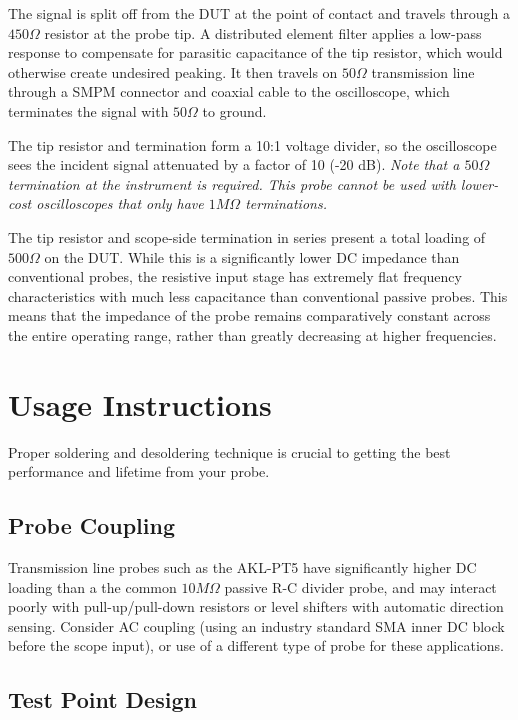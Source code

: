 \documentclass[11pt]{article}
\begin{document}
The signal is split off from the DUT at the point of contact and travels through a $450\Omega$ resistor at the probe
tip. A distributed element filter applies a low-pass response to compensate for parasitic capacitance of the tip
resistor, which would otherwise create undesired peaking. It then travels on $50\Omega$ transmission line through a
SMPM connector and coaxial cable to the oscilloscope, which terminates the signal with $50\Omega$ to ground.

The tip resistor and termination form a 10:1 voltage divider, so the oscilloscope sees the incident signal attenuated
by a factor of 10 (-20 dB). \emph{Note that a $50 \Omega$ termination at the instrument is required. This probe cannot
be used with lower-cost oscilloscopes that only have $1M \Omega$ terminations.}

The tip resistor and scope-side termination in series present a total loading of $500 \Omega$ on the DUT. While this is
a significantly lower DC impedance than conventional probes, the resistive input stage has extremely flat frequency
characteristics with much less capacitance than conventional passive probes. This means that the impedance of the probe
remains comparatively constant across the entire operating range, rather than greatly decreasing at higher frequencies.

\pagebreak

\section{Usage Instructions}

Proper soldering and desoldering technique is crucial to getting the best performance and lifetime from your probe.

\subsection{Probe Coupling}

Transmission line probes such as the AKL-PT5 have significantly higher DC loading than a the common $10M\Omega$ passive
R-C divider probe, and may interact poorly with pull-up/pull-down resistors or level shifters with automatic direction
sensing. Consider AC coupling (using an industry standard SMA inner DC block before the scope input), or use of a
different type of probe for these applications.

\subsection{Test Point Design}
\end{document}

